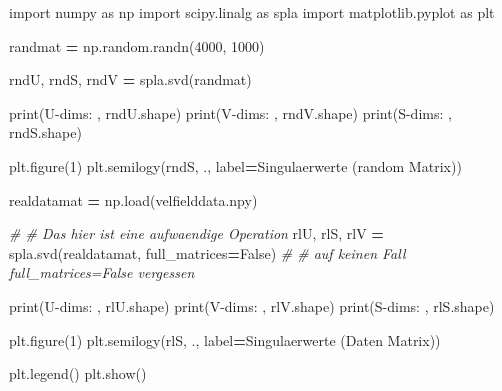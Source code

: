 \documentclass[
]{book}
\newenvironment{Shaded}{\begin{snugshade}}{\end{snugshade}}
\newcommand{\BuiltInTok}[1]{#1}
\newcommand{\CommentTok}[1]{\textcolor[rgb]{0.56,0.35,0.01}{\textit{#1}}}
\newcommand{\DecValTok}[1]{\textcolor[rgb]{0.00,0.00,0.81}{#1}}
\newcommand{\ImportTok}[1]{#1}
\newcommand{\NormalTok}[1]{#1}
\newcommand{\OperatorTok}[1]{\textcolor[rgb]{0.81,0.36,0.00}{\textbf{#1}}}
\newcommand{\StringTok}[1]{\textcolor[rgb]{0.31,0.60,0.02}{#1}}
\newcommand{\VariableTok}[1]{\textcolor[rgb]{0.00,0.00,0.00}{#1}}
\theoremstyle{definition}
\theoremstyle{definition}
\theoremstyle{definition}
\theoremstyle{definition}
\theoremstyle{remark}
\begin{document}
\begin{Shaded}
\begin{Highlighting}[]
\ImportTok{import}\NormalTok{ numpy }\ImportTok{as}\NormalTok{ np}
\ImportTok{import}\NormalTok{ scipy.linalg }\ImportTok{as}\NormalTok{ spla}
\ImportTok{import}\NormalTok{ matplotlib.pyplot }\ImportTok{as}\NormalTok{ plt}

\NormalTok{randmat }\OperatorTok{=}\NormalTok{ np.random.randn(}\DecValTok{4000}\NormalTok{, }\DecValTok{1000}\NormalTok{)}

\NormalTok{rndU, rndS, rndV }\OperatorTok{=}\NormalTok{ spla.svd(randmat)}

\BuiltInTok{print}\NormalTok{(}\StringTok{\textquotesingle{}U{-}dims: \textquotesingle{}}\NormalTok{, rndU.shape)}
\BuiltInTok{print}\NormalTok{(}\StringTok{\textquotesingle{}V{-}dims: \textquotesingle{}}\NormalTok{, rndV.shape)}
\BuiltInTok{print}\NormalTok{(}\StringTok{\textquotesingle{}S{-}dims: \textquotesingle{}}\NormalTok{, rndS.shape)}

\NormalTok{plt.figure(}\DecValTok{1}\NormalTok{)}
\NormalTok{plt.semilogy(rndS, }\StringTok{\textquotesingle{}.\textquotesingle{}}\NormalTok{, label}\OperatorTok{=}\StringTok{\textquotesingle{}Singulaerwerte (random Matrix)\textquotesingle{}}\NormalTok{)}

\NormalTok{realdatamat }\OperatorTok{=}\NormalTok{ np.load(}\StringTok{\textquotesingle{}velfielddata.npy\textquotesingle{}}\NormalTok{)}

\CommentTok{\# \# Das hier ist eine aufwaendige Operation}
\NormalTok{rlU, rlS, rlV }\OperatorTok{=}\NormalTok{ spla.svd(realdatamat, full\_matrices}\OperatorTok{=}\VariableTok{False}\NormalTok{)}
\CommentTok{\# \# auf keinen Fall \textasciigrave{}full\_matrices=False\textasciigrave{} vergessen}

\BuiltInTok{print}\NormalTok{(}\StringTok{\textquotesingle{}U{-}dims: \textquotesingle{}}\NormalTok{, rlU.shape)}
\BuiltInTok{print}\NormalTok{(}\StringTok{\textquotesingle{}V{-}dims: \textquotesingle{}}\NormalTok{, rlV.shape)}
\BuiltInTok{print}\NormalTok{(}\StringTok{\textquotesingle{}S{-}dims: \textquotesingle{}}\NormalTok{, rlS.shape)}

\NormalTok{plt.figure(}\DecValTok{1}\NormalTok{)}
\NormalTok{plt.semilogy(rlS, }\StringTok{\textquotesingle{}.\textquotesingle{}}\NormalTok{, label}\OperatorTok{=}\StringTok{\textquotesingle{}Singulaerwerte (Daten Matrix)\textquotesingle{}}\NormalTok{)}

\NormalTok{plt.legend()}
\NormalTok{plt.show()}
\end{Highlighting}
\end{Shaded}
\end{document}
